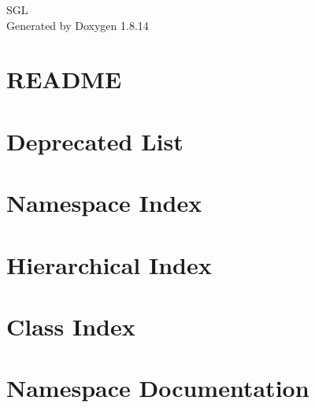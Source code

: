 \documentclass[twoside]{book}
\newcommand{\+}{\discretionary{\mbox{\scriptsize$\hookleftarrow$}}{}{}}
\newcommand{\clearemptydoublepage}{%
  \newpage{\pagestyle{empty}\cleardoublepage}%
}
\begin{document}
\hypersetup{pageanchor=false,
             bookmarksnumbered=true,
             pdfencoding=unicode
            }
\begin{titlepage}
\vspace*{7cm}
\begin{center}%
{\Large S\+GL }\\
\vspace*{1cm}
{\large Generated by Doxygen 1.8.14}\\
\end{center}
\end{titlepage}
\clearemptydoublepage
{}
\tableofcontents
\clearemptydoublepage
{}
\hypersetup{pageanchor=true}

\chapter{R\+E\+A\+D\+ME}
\label{md__home_stepp_Dropbox_data_docs_stanford_sgl_lib_README}

\chapter{Deprecated List}
\label{deprecated}

\chapter{Namespace Index}

\chapter{Hierarchical Index}

\chapter{Class Index}

\chapter{Namespace Documentation}





\end{document}
